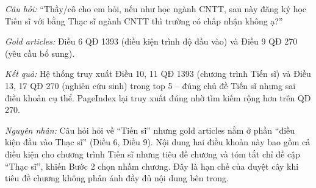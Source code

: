 \textit{Câu hỏi:} ``Thầy/cô cho em hỏi, nếu như học ngành CNTT, sau này đăng ký học Tiến
sĩ với bằng Thạc sĩ ngành CNTT thì trường có chấp nhận không ạ?''

\textit{Gold articles:} Điều 6 QĐ 1393 (điều kiện trình độ đầu vào) và Điều 9 QĐ 270 (yêu
cầu bổ sung).

\textit{Kết quả:} Hệ thống truy xuất Điều 10, 11 QĐ 1393 (chương trình Tiến sĩ) và Điều 13,
17 QĐ 270 (nghiên cứu sinh) trong top 5 -- đúng chủ đề Tiến sĩ nhưng sai điều khoản cụ
thể. PageIndex lại truy xuất đúng nhờ tìm kiếm rộng hơn trên QĐ 270.

\textit{Nguyên nhân:} Câu hỏi hỏi về ``Tiến sĩ'' nhưng gold articles nằm ở phần ``điều kiện
đầu vào Thạc sĩ'' (Điều 6, Điều 9). Nội dung hai điều khoản này bao gồm cả điều kiện
cho chương trình Tiến sĩ nhưng tiêu đề chương và tóm tắt chỉ đề cập ``Thạc sĩ'', khiến
Bước 2 chọn nhầm chương. Đây là hạn chế của duyệt cây khi tiêu đề chương không phản
ánh đầy đủ nội dung bên trong.
